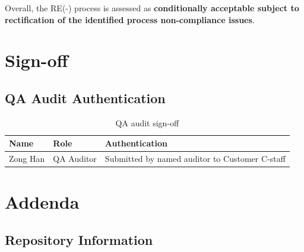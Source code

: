 \documentclass[11pt,a4paper]{article}
\begin{document}
Overall, the RE(-) process is assessed as \textbf{conditionally acceptable subject to rectification of the identified process non-compliance issues}.


\section{Sign-off}

\subsection{QA Audit Authentication}

\begin{table}[H]
\centering
\small
\renewcommand{\arraystretch}{1.6}
\begin{tabular}{|m{}|m{}|m{}|}
\hline
\rowcolor{tableheader}
\textbf{Name} & \textbf{Role} & \textbf{Authentication} \\
\hline
Zong Han & QA Auditor & Submitted by named auditor to Customer C-staff \\
\hline
\end{tabular}
\caption{QA audit sign-off}
\label{tab:qa-signoff}
\end{table}


\section{Addenda}

\subsection{Repository Information}

\begin{center}
\end{center}
\end{document}
